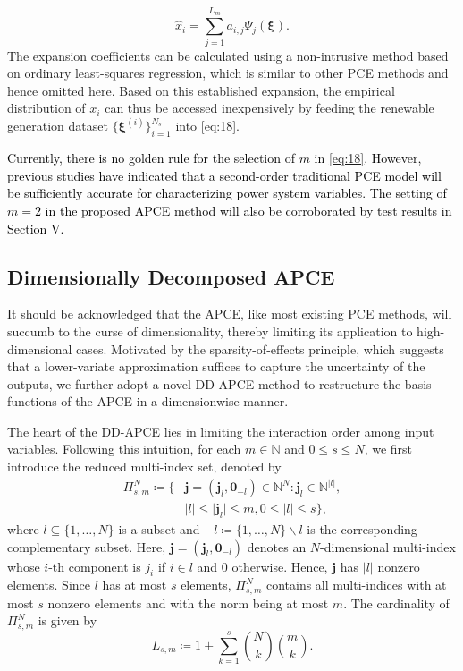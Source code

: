 \documentclass[journal]{IEEEtran}
\theoremstyle{definition}
\theoremstyle{remark}
\begin{document}
\begin{equation}\label{eq:18}
    \hat{x}_i=\sum\limits_{j=1}^{L_{m}}a_{i,j}\Psi_j(\boldsymbol{\xi}).
\end{equation}
The expansion coefficients can be calculated using a non-intrusive method based on ordinary least-squares regression, which is similar to other PCE methods and hence omitted here. Based on this established expansion, the empirical distribution of $x_i$ can thus be accessed inexpensively by feeding the renewable generation dataset $\{\boldsymbol{\xi}^{(i)}\}_{i=1}^{N_s}$ into \eqref{eq:18}.

\textcolor{black}{Currently, there is no golden rule for the selection of $m$ in \eqref{eq:18}. However, previous studies \cite{xu2021iterative,muhlpfordt2019chance} have indicated that a second-order traditional PCE model will be sufficiently accurate for characterizing power system variables. The setting of $m=2$ in the proposed APCE method will also be corroborated by test results in Section V.}
\subsection{Dimensionally Decomposed APCE}\label{DD-APCE}
It should be acknowledged that the APCE, like most existing PCE methods, will succumb to the curse of dimensionality, thereby limiting its application to high-dimensional cases. Motivated by the sparsity-of-effects principle, which suggests that a lower-variate approximation suffices to capture the uncertainty of the outputs, we further adopt a novel DD-APCE method \cite{lee2023high} to restructure the basis functions of the APCE in a dimensionwise manner.

The heart of the DD-APCE lies in limiting the interaction order among input variables. Following this intuition, for each $m\in \mathbb{N}$ and $0\leq s\leq N$, we first introduce the reduced multi-index set, denoted by
\begin{equation}\label{eq:19}
    \begin{split}
        \Pi_{s,m}^{N}\coloneqq\{&\boldsymbol{j}=(\boldsymbol{j}_l, \mathbf{0}_{-l})\in\mathbb{N}^N:\boldsymbol{j}_l\in\mathbb{N}^{\vert l\vert}, \\
        &\vert l\vert\leq\vert \boldsymbol{j}_l\vert\leq m, 0\leq\vert l\vert\leq s\},
    \end{split}
\end{equation}
where $l\subseteq\{1,\dots,N\}$ is a subset and $-l\coloneqq\{1,\dots,N\}\backslash l$ is the corresponding complementary subset. Here, $\boldsymbol{j}=(\boldsymbol{j}_l,\mathbf{0}_{-l})$ denotes an $N$-dimensional multi-index whose $i$-th component is $j_i$ if $i\in l$ and 0 otherwise. Hence, $\boldsymbol{j}$ has $\vert l\vert$ nonzero elements. Since $l$ has at most $s$ elements, $\Pi_{s,m}^N$ contains all multi-indices with at most $s$ nonzero elements and with the norm being at most $m$. The cardinality of $\Pi_{s,m}^N$ is given by
\begin{equation}\label{eq:20}
    L_{s,m}\coloneqq 1+\sum\limits_{k=1}^s\binom{N}{k}\binom{m}{k}.
\end{equation}
\end{document}
